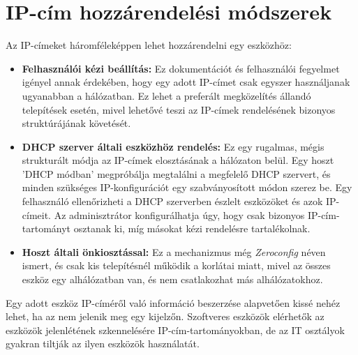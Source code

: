 \section{IP-cím hozzárendelési módszerek}
Az IP-címeket háromféleképpen lehet hozzárendelni egy eszközhöz:
\begin{itemize}
    \item \textbf{Felhasználói kézi beállítás:}
    Ez dokumentációt és felhasználói fegyelmet igényel annak érdekében,
	hogy egy adott IP-címet csak egyszer használjanak ugyanabban a hálózatban.
	Ez lehet a preferált megközelítés állandó telepítések esetén,
	mivel lehetővé teszi az IP-címek rendelésének bizonyos struktúrájának követését.
    
    \item \textbf{DHCP szerver általi eszközhöz rendelés:}
    Ez egy rugalmas, mégis strukturált módja az IP-címek elosztásának a hálózaton belül.
	Egy hoszt 'DHCP módban' megpróbálja megtalálni a megfelelő DHCP szervert,
	és minden szükséges IP-konfigurációt egy szabványosított módon szerez be.
	Egy felhasználó ellenőrizheti a DHCP szerverben észlelt eszközöket és azok IP-címeit.
	Az adminisztrátor konfigurálhatja úgy, hogy csak bizonyos IP-cím-tartományt osztanak ki,
	míg másokat kézi rendelésre tartalékolnak.
    
    \item \textbf{Hoszt általi önkiosztással:}
    Ez a mechanizmus még \textit{Zeroconfig} néven ismert, és csak kis telepítésnél
	működik a korlátai miatt, mivel az összes eszköz egy alhálózatban van,
	és nem csatlakozhat más alhálózatokhoz.
\end{itemize}
Egy adott eszköz IP-címéről való információ beszerzése alapvetően kissé nehéz lehet,
ha az nem jelenik meg egy kijelzőn. 
Szoftveres eszközök elérhetők az eszközök jelenlétének szkennelésére IP-cím-tartományokban,
de az IT osztályok gyakran tiltják az ilyen eszközök használatát.

